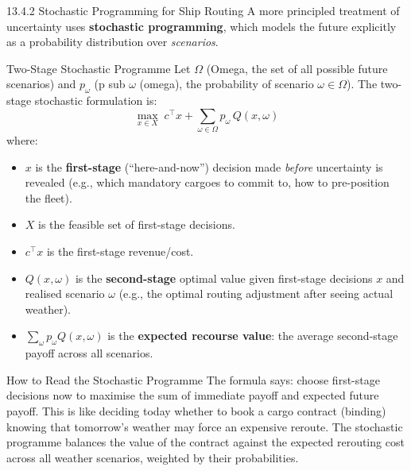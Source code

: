 \documentclass[aspectratio=169,10pt]{beamer}
\begin{document}
\begin{frame}[allowframebreaks]{13.4.2 Stochastic Programming for Ship Routing}
  A more principled treatment of uncertainty uses \textbf{stochastic
  programming}, which models the future explicitly as a probability
  distribution over \emph{scenarios}.

  \medskip
  \begin{block}{Two-Stage Stochastic Programme}
    Let $\Omega$ (Omega, the set of all possible future scenarios) and
    $p_\omega$ (p sub $\omega$ (omega), the probability of scenario
    $\omega \in \Omega$).  The two-stage stochastic formulation is:
    \begin{equation}
      \max_{x \in X} \; c^\top x + \sum_{\omega \in \Omega} p_\omega \, Q(x, \omega)
    \end{equation}
    where:
    \begin{itemize}
      \item $x$ is the \textbf{first-stage} (``here-and-now'') decision made
            \emph{before} uncertainty is revealed (e.g., which mandatory
            cargoes to commit to, how to pre-position the fleet).
      \item $X$ is the feasible set of first-stage decisions.
      \item $c^\top x$ is the first-stage revenue/cost.
      \item $Q(x, \omega)$ is the \textbf{second-stage} optimal value
            given first-stage decisions $x$ and realised scenario $\omega$
            (e.g., the optimal routing adjustment after seeing actual weather).
      \item $\sum_\omega p_\omega Q(x, \omega)$ is the
            \textbf{expected recourse value}: the average second-stage payoff
            across all scenarios.
    \end{itemize}
  \end{block}

  \begin{alertblock}{How to Read the Stochastic Programme}
    The formula says: choose first-stage decisions now to maximise the sum
    of immediate payoff and expected future payoff.  This is like deciding
    today whether to book a cargo contract (binding) knowing that tomorrow's
    weather may force an expensive reroute.  The stochastic programme
    balances the value of the contract against the expected rerouting cost
    across all weather scenarios, weighted by their probabilities.
  \end{alertblock}


\end{frame}
\end{document}
